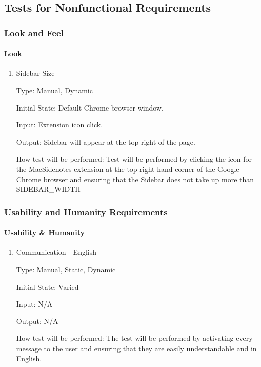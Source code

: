 \documentclass[12pt, titlepage]{article}
\begin{document}
\subsection{Tests for Nonfunctional Requirements}

\subsubsection{Look and Feel}
		
\paragraph{Look}

\begin{enumerate}

\item{Sidebar Size\\}

Type: Manual, Dynamic

Initial State: Default Chrome browser window.

Input: Extension icon click.

Output: Sidebar will appear at the top right of the page.

How test will be performed: Test will be performed by clicking the icon for the 
MacSidenotes extension at the top right hand corner of the Google Chrome browser and 
ensuring that the Sidebar does not take up more than SIDEBAR\_WIDTH		
 
\end{enumerate}

\subsubsection{Usability and Humanity Requirements}

\paragraph{Usability \& Humanity}

\begin{enumerate}

\item{Communication - English\\}

Type: Manual, Static, Dynamic

Initial State: Varied

Input: N/A

Output: N/A

How test will be performed: The test will be performed by activating every message to the 
user and ensuring that they are easily understandable and in English. 

\end{enumerate}
\end{document}
